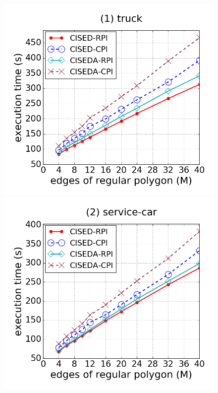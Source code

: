 




\begin{figure}[tb!]
\centering
\includegraphics[scale = 0.250]{figures/Exp-M-e-60-time-truck.png}
\includegraphics[scale = 0.250]{figures/Exp-M-e-60-time-service.png}

\end{figure}
